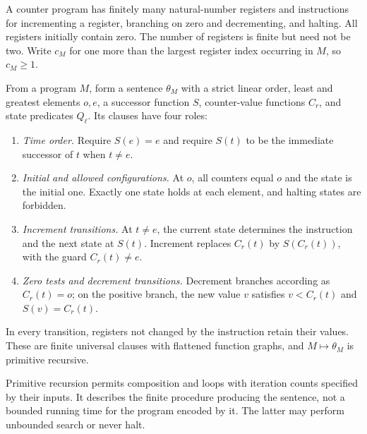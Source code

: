A counter program has finitely many natural-number registers and instructions
for incrementing a register, branching on zero and decrementing, and halting.
All registers initially contain zero. The number of registers is finite
but need not be two. Write $c_M$ for one more than the largest register index
occurring in $M$, so $c_M\ge1$.

From a program $M$, form a sentence $\theta_M$ with a strict linear order,
least and greatest elements $o,e$, a successor function $S$, counter-value
functions $C_r$, and state predicates $Q_\ell$. Its clauses have four roles:
\begin{enumerate}
\item \emph{Time order.} Require $S(e)=e$ and require $S(t)$ to be
the immediate successor of $t$ when $t\ne e$.
\item \emph{Initial and allowed configurations.} At $o$, all counters
equal $o$ and the state is the initial one. Exactly one state holds
at each element, and halting states are forbidden.
\item \emph{Increment transitions.} At $t\ne e$, the current state
determines the instruction and the next state at $S(t)$. Increment
replaces $C_r(t)$ by $S(C_r(t))$, with the guard $C_r(t)\ne e$.
\item \emph{Zero tests and decrement transitions.} Decrement branches
according as $C_r(t)=o$; on the positive branch, the new value $v$
satisfies $v<C_r(t)$ and $S(v)=C_r(t)$.
\end{enumerate}
In every transition, registers not changed by the instruction retain
their values. These are finite universal clauses with flattened function graphs,
and $M\mapsto\theta_M$ is primitive recursive.

Primitive recursion permits composition and loops with iteration counts
specified by their inputs. It describes the finite procedure producing
the sentence, not a bounded running time for the program encoded by it.
The latter may perform unbounded search or never halt.

